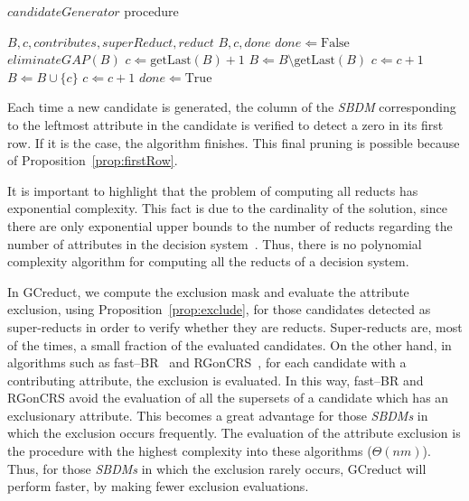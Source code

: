 \documentclass[letterpaper, twoside, openright, 12pt]{book}%
\begin{document}
	\begin{algorithm}
	\footnotesize
	\caption{$candidateGenerator$ procedure}
	\label{alg:CandGenerator}
		\begin{algorithmic}[1]
			\Require \textit{$B,c,contributes,superReduct,reduct$}
			\Ensure $B,c,done$ 
			\State $done \Leftarrow \mathrm{False}$
			\label{line:cg} 
			\label{line:gap} 
			\State $eliminateGAP(B)$
			\EndIf
			\State $c \Leftarrow  \mathrm{getLast}(B)+1$
			\State $B \Leftarrow B\setminus \mathrm{getLast}(B)$\label{line:remLast}
			\Else
			\label{line:NCorSR}
			\State $c \Leftarrow c+1$\label{line:replaceC} 
			\Else
			\State $B \Leftarrow B\cup \lbrace c\rbrace$\label{line:add1} 
			\State $c \Leftarrow c+1$\label{line:add1End} 
			\EndIf
			\EndIf
			 \label{line:done}
			\State $done \Leftarrow \mathrm{True}$
			\EndIf
		\end{algorithmic}
	\end{algorithm}
	
	Each time a new candidate is generated, the column of the \textit{SBDM} corresponding to the leftmost attribute in the candidate is verified to detect a zero in its first row. If it is the case, the algorithm finishes. This final pruning is possible because of Proposition~\ref{prop:firstRow}.
			
	It is important to highlight that the problem of computing all reducts has exponential complexity. This fact is due to the cardinality of the solution, since there are only exponential upper bounds to the number of reducts regarding the number of attributes in the decision system~\cite{Skowron92}. Thus, there is no polynomial complexity algorithm for computing all the reducts of a decision system.
	
	In GCreduct, we compute the exclusion mask and evaluate the attribute exclusion, using Proposition~\ref{prop:exclude}, for those candidates detected as super-reducts in order to verify whether they are reducts. Super-reducts are, most of the times, a small fraction of the evaluated candidates. On the other hand, in algorithms such as fast--BR~\cite{Lias13} and RGonCRS~\cite{WangP07}, for each candidate with a contributing attribute, the exclusion is evaluated. In this way, fast--BR and RGonCRS avoid the evaluation of all the supersets of a candidate which has an exclusionary attribute. This becomes a great advantage for those \textit{SBDMs} in which the exclusion occurs frequently. The evaluation of the attribute exclusion is the procedure with the highest complexity into these algorithms ($\Theta (nm)$). Thus, for those \textit{SBDMs} in which the exclusion rarely occurs, GCreduct will perform faster, by making fewer exclusion evaluations.
		
\end{document}
